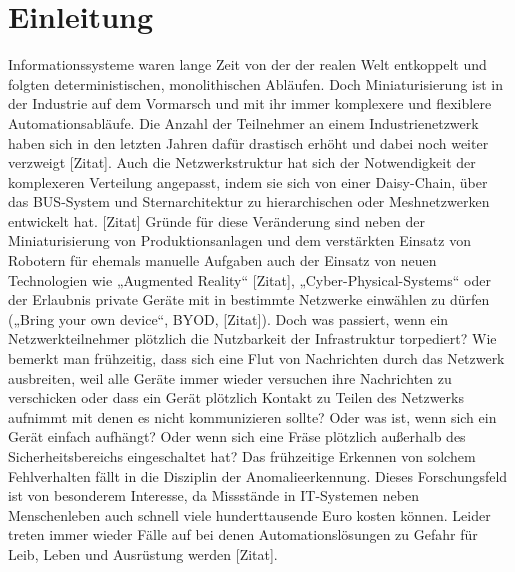 \chapter{Einleitung}
Informationssysteme waren lange Zeit von der der realen Welt entkoppelt und folgten deterministischen, monolithischen Abläufen. Doch Miniaturisierung ist in der Industrie auf dem Vormarsch und mit ihr immer komplexere und flexiblere Automationsabläufe. Die Anzahl der Teilnehmer an einem Industrienetzwerk haben sich in den letzten Jahren dafür drastisch erhöht und dabei noch weiter verzweigt [Zitat]. Auch die Netzwerkstruktur hat sich der Notwendigkeit der komplexeren Verteilung angepasst, indem sie sich von einer Daisy-Chain, über das BUS-System und Sternarchitektur zu hierarchischen oder Meshnetzwerken entwickelt hat. [Zitat]
Gründe für diese Veränderung sind neben der Miniaturisierung von Produktionsanlagen und dem verstärkten Einsatz von Robotern für ehemals manuelle Aufgaben auch der Einsatz von neuen Technologien wie „Augmented Reality“ [Zitat], „Cyber-Physical-Systems“ oder der Erlaubnis private Geräte mit in bestimmte Netzwerke einwählen zu dürfen („Bring your own device“, BYOD, [Zitat]).
Doch was passiert, wenn ein Netzwerkteilnehmer plötzlich die Nutzbarkeit der Infrastruktur torpediert? Wie bemerkt man frühzeitig, dass sich eine Flut von Nachrichten durch das Netzwerk ausbreiten, weil alle Geräte immer wieder versuchen ihre Nachrichten zu verschicken oder dass ein Gerät plötzlich Kontakt zu Teilen des Netzwerks aufnimmt mit denen es nicht kommunizieren sollte? Oder was ist, wenn sich ein Gerät einfach aufhängt? Oder wenn sich eine Fräse plötzlich außerhalb des Sicherheitsbereichs eingeschaltet hat?
Das frühzeitige Erkennen von solchem Fehlverhalten fällt in die Disziplin der Anomalieerkennung. Dieses Forschungsfeld ist von besonderem Interesse, da Missstände in IT-Systemen neben Menschenleben auch schnell viele hunderttausende Euro kosten können. Leider treten immer wieder Fälle auf bei denen Automationslösungen zu Gefahr für Leib, Leben und Ausrüstung werden [Zitat].


